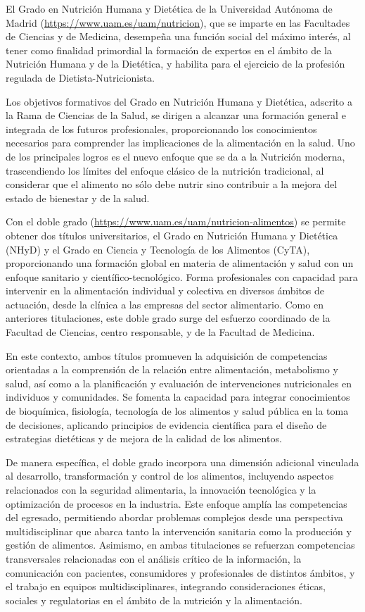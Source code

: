 \documentclass[
  11pt,
  a4paper,
  twoside]{scrreprt}
\begin{document}
El Grado en Nutrición Humana y Dietética de la Universidad Autónoma de
Madrid (\url{https://www.uam.es/uam/nutricion}), que se imparte en las
Facultades de Ciencias y de Medicina, desempeña una función social del
máximo interés, al tener como finalidad primordial la formación de
expertos en el ámbito de la Nutrición Humana y de la Dietética, y
habilita para el ejercicio de la profesión regulada de
Dietista-Nutricionista.

Los objetivos formativos del Grado en Nutrición Humana y Dietética,
adscrito a la Rama de Ciencias de la Salud, se dirigen a alcanzar una
formación general e integrada de los futuros profesionales,
proporcionando los conocimientos necesarios para comprender las
implicaciones de la alimentación en la salud. Uno de los principales
logros es el nuevo enfoque que se da a la Nutrición moderna,
trascendiendo los límites del enfoque clásico de la nutrición
tradicional, al considerar que el alimento no sólo debe nutrir sino
contribuir a la mejora del estado de bienestar y de la salud.

Con el doble grado (\url{https://www.uam.es/uam/nutricion-alimentos}) se
permite obtener dos títulos universitarios, el Grado en Nutrición Humana
y Dietética (NHyD) y el Grado en Ciencia y Tecnología de los Alimentos
(CyTA), proporcionando una formación global en materia de alimentación y
salud con un enfoque sanitario y científico-tecnológico. Forma
profesionales con capacidad para intervenir en la alimentación
individual y colectiva en diversos ámbitos de actuación, desde la
clínica a las empresas del sector alimentario. Como en anteriores
titulaciones, este doble grado surge del esfuerzo coordinado de la
Facultad de Ciencias, centro responsable, y de la Facultad de Medicina.

En este contexto, ambos títulos promueven la adquisición de competencias
orientadas a la comprensión de la relación entre alimentación,
metabolismo y salud, así como a la planificación y evaluación de
intervenciones nutricionales en individuos y comunidades. Se fomenta la
capacidad para integrar conocimientos de bioquímica, fisiología,
tecnología de los alimentos y salud pública en la toma de decisiones,
aplicando principios de evidencia científica para el diseño de
estrategias dietéticas y de mejora de la calidad de los alimentos.

De manera específica, el doble grado incorpora una dimensión adicional
vinculada al desarrollo, transformación y control de los alimentos,
incluyendo aspectos relacionados con la seguridad alimentaria, la
innovación tecnológica y la optimización de procesos en la industria.
Este enfoque amplía las competencias del egresado, permitiendo abordar
problemas complejos desde una perspectiva multidisciplinar que abarca
tanto la intervención sanitaria como la producción y gestión de
alimentos. Asimismo, en ambas titulaciones se refuerzan competencias
transversales relacionadas con el análisis crítico de la información, la
comunicación con pacientes, consumidores y profesionales de distintos
ámbitos, y el trabajo en equipos multidisciplinares, integrando
consideraciones éticas, sociales y regulatorias en el ámbito de la
nutrición y la alimentación.
\end{document}
